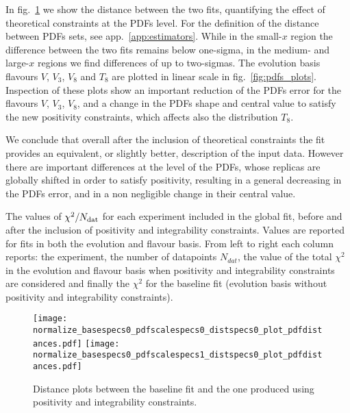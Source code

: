 %
In fig.~\ref{fig:distances} we show the distance between the two fits, quantifying the effect of theoretical
constraints at the PDFs level. For the definition of the distance between PDFs sets, see app.~\ref{app:estimators}.
While in the small-$x$ region the difference between the two fits remains below 
one-sigma, in the medium- and large-$x$ regions we find differences of up to
two-sigmas. The evolution basis flavours $V$, $V_3$, $V_8$ and $T_8$ are plotted in linear scale in fig.~\ref{fig:pdfs_plots}.
Inspection of these plots show an important reduction of the PDFs error for the flavours $V$, $V_3$, $V_8$,
and a change in the PDFs shape and central value to satisfy the new positivity constraints, which affects also the distribution
$T_8$.

%
We conclude that overall after the inclusion of theoretical constraints the fit provides an equivalent,
or slightly better, description of the input data. However there are important differences at the level of the PDFs,
whose replicas are globally shifted in order to satisfy positivity, resulting in a general decreasing in the PDFs error,
and in a non negligible change in their central value.

\begin{table}[htbp!]
    \centering
    
    \caption{The values of $\chi^2/N_{\rm dat}$ for each experiment included in the global fit, before and
    after the inclusion of positivity and integrability constraints. Values are reported for fits in both the evolution and flavour 
    basis. From left to right each column reports: the experiment, the number of datapoints $N_{dat}$, the value of the
    total $\chi^2$ in the evolution and flavour basis when positivity and integrability constraints
    are considered and finally the $\chi^2$ for the baseline fit (evolution basis without positivity and integrability
    constraints).}
    \label{tab:experiments_chi2}
\end{table}

\begin{figure}[t!]
    \begin{center}
        \texttt{[image: normalize\_basespecs0\_pdfscalespecs0\_distspecs0\_plot\_pdfdistances.pdf]}
        \texttt{[image: normalize\_basespecs0\_pdfscalespecs1\_distspecs0\_plot\_pdfdistances.pdf]}
        \caption{Distance plots between the baseline fit and the one produced using positivity and integrability
        constraints.} 
        \label{fig:distances} 
    \end{center}
\end{figure}

